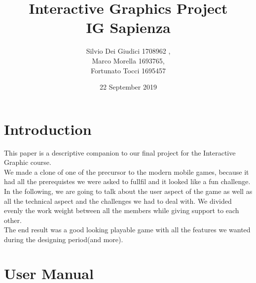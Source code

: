 \documentclass[a4paper, 11pt]{article}
\title { Interactive Graphics Project\\ \bigskip \large IG Sapienza}
\date{22 September 2019}
\author{Silvio Dei Giudici 1708962 , \\Marco Morella 1693765, \\Fortunato Tocci 1695457}
\begin{document}
\maketitle

\section{Introduction}
This paper is a descriptive companion to our final project for the Interactive Graphic course.\\
We made a clone of one of the precursor to the modern mobile games, because it had all the prerequistes we were asked to fullfil and it looked like a fun challenge. In the following, we are going to talk about the user aspect of the game as well as all the technical aspect and the challenges we had to deal with. We divided evenly the work weight between all the members while giving support to each other.\\
The end result was a good looking playable game with all the features we wanted during the designing period(and more).
\newpage

\section{User Manual}
\end{document}
